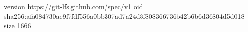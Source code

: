 version https://git-lfs.github.com/spec/v1
oid sha256:afa084730ae9f7fdf556a0bb307ad7a24d8f808366736b42b6b6d36804d5d018
size 1666
